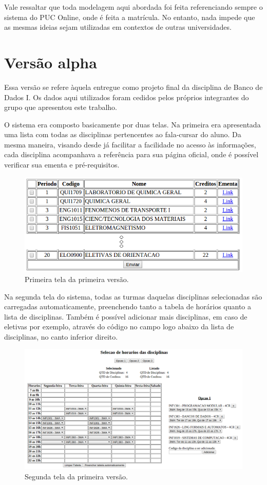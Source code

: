 \documentclass[graduacao,brazil]{ThesisPUC}
\begin{document}
Vale ressaltar que toda modelagem aqui abordada foi feita referenciando sempre o sistema do PUC Online, onde é feita a matrícula. No entanto, nada impede que as mesmas ideias sejam utilizadas em contextos de outras universidades.


\section{Versão alpha}

Essa versão se refere àquela entregue como projeto final da disciplina de Banco de Dados I. Os dados aqui utilizados foram cedidos pelos próprios integrantes do grupo que apresentou este trabalho.

O sistema era composto basicamente por duas telas. Na primeira era apresentada uma lista com todas as disciplinas pertencentes ao fala-cursar do aluno. Da mesma maneira, visando desde já facilitar a facilidade no acesso às informações, cada disciplina acompanhava a referência para sua página oficial, onde é possível verificar sua ementa e pré-requisitos.

\begin{figure}[H]
    \centering
    \includegraphics[width=0.7\linewidth]{img/v1_p1.png}
    \caption{Primeira tela da primeira versão.}
\end{figure}

Na segunda tela do sistema, todas as turmas daquelas disciplinas selecionadas são carregadas automaticamente, preenchendo tanto a tabela de horários quanto a lista de disciplinas. Também é possível adicionar mais disciplinas, em caso de eletivas por exemplo, através do código no campo logo abaixo da lista de disciplinas, no canto inferior direito.

\begin{figure}[H]
    \centering
    \includegraphics[width=\linewidth]{img/v1_p2.png}
    \caption{Segunda tela da primeira versão.}
\end{figure}
\end{document}
